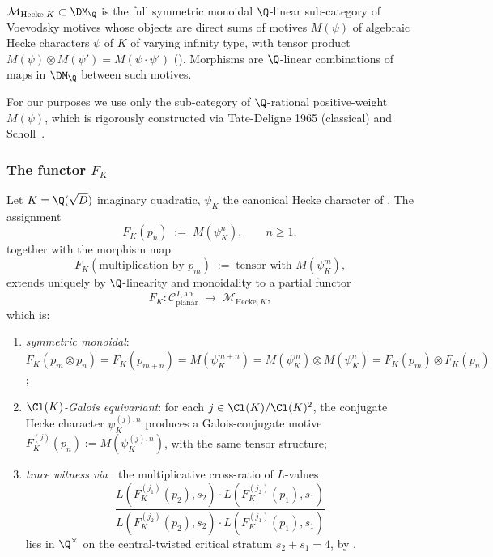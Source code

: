 \begin{definition}\label{def:M-Hecke-K}
$\mathcal{M}_{\mathrm{Hecke}, K} \subset \DM_\Q$ is the full
symmetric monoidal $\Q$-linear sub-category of Voevodsky motives
whose objects are direct sums of motives $M(\psi)$ of algebraic
Hecke characters $\psi$ of $K$ of varying infinity type, with
tensor product $M(\psi) \otimes M(\psi') = M(\psi \cdot \psi')$
(). Morphisms are $\Q$-linear combinations of
maps in $\DM_\Q$ between such motives.
\end{definition}

For our purposes we use only the sub-category of $\Q$-rational
positive-weight $M(\psi)$, which is rigorously constructed via
Tate-Deligne 1965 (classical) and Scholl~\cite{Scholl1990}.

\subsubsection{The functor $F_K$}\label{ss:T3-functor}

\begin{theorem}
\label{thm:T3-functor}
Let $K = \Q(\sqrt{D})$ imaginary quadratic, $\psi_K$ the
canonical Hecke character of . The assignment
\begin{equation}\label{eq:F-K-object-map}
F_K(p_n) \;:=\; M(\psi_K^n), \qquad n \geq 1,
\end{equation}
together with the morphism map
\begin{equation}\label{eq:F-K-morph-map}
F_K(\text{multiplication by }p_m) \;:=\; \text{tensor with }
M(\psi_K^m),
\end{equation}
extends uniquely by $\Q$-linearity and monoidality to a partial
functor
\[
F_K \colon \mathcal{C}_{\mathrm{planar}}^{T,\mathrm{ab}}
\;\longrightarrow\; \mathcal{M}_{\mathrm{Hecke}, K},
\]
which is:
\begin{enumerate}
\item[\textup{(F1)}] \emph{symmetric monoidal}: $F_K(p_m \otimes
p_n) = F_K(p_{m+n}) = M(\psi_K^{m+n}) = M(\psi_K^m) \otimes
M(\psi_K^n) = F_K(p_m) \otimes F_K(p_n)$;
\item[\textup{(F2)}] \emph{$\Cl(K)$-Galois equivariant}: for each
$j \in \Cl(K)/\Cl(K)^2$, the conjugate Hecke character
$\psi_K^{(j), n}$ produces a Galois-conjugate motive
$F_K^{(j)}(p_n) := M(\psi_K^{(j), n})$, with the same tensor
structure;
\item[\textup{(F3)}] \emph{trace witness via }: the
multiplicative cross-ratio of $L$-values
\begin{equation}\label{eq:F-K-cross-ratio}
\frac{L(F_K^{(j_1)}(p_2), s_2) \cdot L(F_K^{(j_2)}(p_1), s_1)}
     {L(F_K^{(j_2)}(p_2), s_2) \cdot L(F_K^{(j_1)}(p_1), s_1)}
\end{equation}
lies in $\Q^\times$ on the central-twisted critical stratum
$s_2 + s_1 = 4$, by .
\end{enumerate}
\end{theorem}

